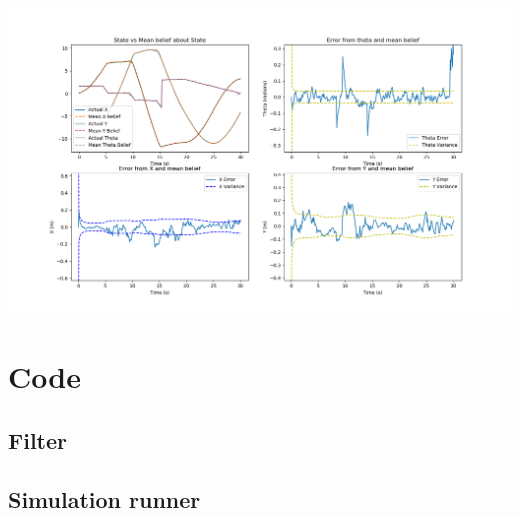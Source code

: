 \documentclass[a4paper]{article}
\begin{document}
\begin{center}
    \includegraphics[scale=0.5]{images/ErrorPlots.png}
\end{center}

\section{Code}
\begin{adjustwidth}{-50pt}{0pt}
\subsection{Filter}

\subsection{Simulation runner}

\end{adjustwidth}
\end{document}
